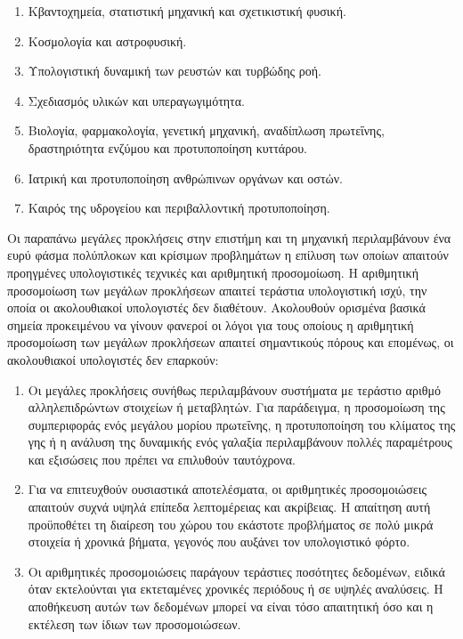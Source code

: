 \documentclass[12pt,a4paper]{article}
\begin{document}
\begin{enumerate} [font=\bfseries]
    \item {Κβαντοχημεία, στατιστική μηχανική και σχετικιστική φυσική.}
    \item {Κοσμολογία και αστροφυσική.}
    \item {Υπολογιστική δυναμική των ρευστών και τυρβώδης ροή.}
    \item {Σχεδιασμός υλικών και υπεραγωγιμότητα.}
    \item {Βιολογία, φαρμακολογία, γενετική μηχανική, αναδίπλωση πρωτεΐνης,
    δραστηριότητα ενζύμου και προτυποποίηση κυττάρου.}
    \item {Ιατρική και προτυποποίηση ανθρώπινων οργάνων και οστών.}
    \item {Καιρός της υδρογείου και περιβαλλοντική προτυποποίηση.}
\end{enumerate}

Οι παραπάνω μεγάλες προκλήσεις στην επιστήμη και τη μηχανική περιλαμβάνουν
ένα ευρύ φάσμα πολύπλοκων και κρίσιμων προβλημάτων η επίλυση των οποίων
απαιτούν προηγμένες υπολογιστικές τεχνικές και αριθμητική προσομοίωση.
Η αριθμητική προσομοίωση των μεγάλων προκλήσεων απαιτεί τεράστια υπολογιστική
ισχύ, την οποία οι ακολουθιακοί υπολογιστές δεν διαθέτουν. Ακολουθούν ορισμένα
βασικά σημεία προκειμένου να γίνουν φανεροί οι λόγοι για τους οποίους η αριθμητική
προσομοίωση των μεγάλων προκλήσεων απαιτεί σημαντικούς πόρους και επομένως,
οι ακολουθιακοί υπολογιστές δεν επαρκούν:

\begin{enumerate}[label=\Roman*.]
    \item Οι μεγάλες προκλήσεις συνήθως περιλαμβάνουν συστήματα με τεράστιο
    αριθμό αλληλεπιδρώντων στοιχείων ή μεταβλητών. Για παράδειγμα, η
    προσομοίωση της συμπεριφοράς ενός μεγάλου μορίου πρωτεΐνης, η προτυποποίηση
    του κλίματος της γης ή η ανάλυση της δυναμικής ενός γαλαξία περιλαμβάνουν
    πολλές παραμέτρους και εξισώσεις που πρέπει να επιλυθούν ταυτόχρονα.

    \item Για να επιτευχθούν ουσιαστικά αποτελέσματα, οι αριθμητικές προσομοιώσεις
    απαιτούν συχνά υψηλά επίπεδα λεπτομέρειας και ακρίβειας. Η απαίτηση αυτή
    προϋποθέτει τη διαίρεση του χώρου του εκάστοτε προβλήματος σε πολύ μικρά
    στοιχεία ή χρονικά βήματα, γεγονός που αυξάνει τον υπολογιστικό φόρτο.

    \item Οι αριθμητικές προσομοιώσεις παράγουν τεράστιες ποσότητες δεδομένων,
    ειδικά όταν εκτελούνται για εκτεταμένες χρονικές περιόδους ή σε υψηλές
    αναλύσεις. Η αποθήκευση αυτών των δεδομένων μπορεί να είναι τόσο απαιτητική
    όσο και η εκτέλεση των ίδιων των προσομοιώσεων.
\end{enumerate}
\end{document}
